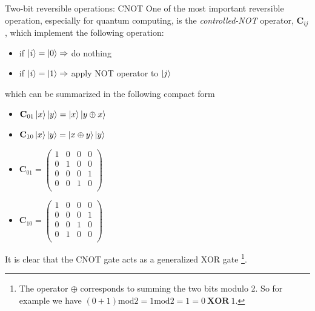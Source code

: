 \documentclass[11p,aspectratio=169]{beamer}
\begin{document}
\begin{frame}{Two-bit reversible operations: CNOT}
    One of the most important reversible operation, especially for quantum computing,
    is the \emph{controlled-NOT} operator, $\textbf{C}_{ij}$, which implement the following
    operation:
    \begin{itemize}
        \item if $\ket{i} = \ket{0} \Rightarrow$ do nothing
        \item if $\ket{i} = \ket{1} \Rightarrow$ apply NOT operator to $\ket{j}$
    \end{itemize}
    which can be summarized in the following compact form

    \begin{multicols*}{2}
        \begin{itemize}
            \item $\textbf{C}_{01} \ket{x} \ket{y} = \ket{x} \ket{y \oplus x} $
            \item $\textbf{C}_{10} \ket{x} \ket{y} = \ket{x \oplus y} \ket{y} $
        \end{itemize}
        
    \end{multicols*}

    \begin{multicols*}{2}
        \begin{itemize}
    \item $\textbf{C}_{01} = \begin{pmatrix}
        1 & 0 & 0 & 0 \\
        0 & 1 & 0 & 0 \\
        0 & 0 & 0 & 1 \\
        0 & 0 & 1 & 0 \\
    \end{pmatrix} $

    \item $\textbf{C}_{10} = \begin{pmatrix}
        1 & 0 & 0 & 0 \\
        0 & 0 & 0 & 1 \\
        0 & 0 & 1 & 0 \\
        0 & 1 & 0 & 0 \\
    \end{pmatrix} $

\end{itemize}
        
\end{multicols*}

It is clear that the CNOT gate acts as a generalized XOR gate \footnote{
    The operator $\oplus$ corresponds to summing the two bits modulo 2. So for example we have
    $ (0 + 1) \text{mod} 2 = 1 \text{mod} 2 = 1 = 0 \ \textbf{XOR} \ 1.$
}.
    
\end{frame}
\end{document}
